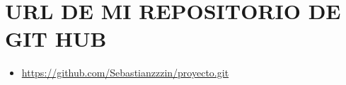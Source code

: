 \section{URL DE MI REPOSITORIO DE GIT HUB}
\begin{itemize}
	\item \url{https://github.com/Sebastianzzzin/proyecto.git}
\end{itemize}